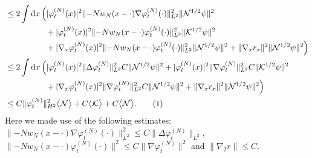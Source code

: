 \documentclass[11pt,a4paper,DIV11]{scrartcl}	%
\newcommand{\di}{\textrm{d}}		%
\newcommand{\Ncal}{\mathcal{N}}		%
\newcommand{\Kcal}{\mathcal{K}}		%
\newcommand{\norm}[1]{\lVert#1\rVert}	%
\newcommand{\ev}[1]{\big<#1\big>}	%
\newcommand{\ph}{\varphi_t^{(N)}}	%
\newcommand{\gradone}{\nabla_2}
\newcommand{\tagg}[1]{ \stepcounter{equation} \tag{\theequation} \label{eq:#1} } %
\begin{document}
\begin{fleqn}[0.5em]
\begin{align*}
& \leq 2\int \di x\, \Big( \lvert \ph(x)\rvert^2 \norm{-N w_N(x-\cdot)\nabla\ph(\cdot)}_{L^2}^2 \norm{\Ncal^{1/2}\psi}^2  \\
& \qquad\qquad\quad + \lvert \ph(x)\rvert^2 \norm{-Nw_N(x-\cdot) \ph(\cdot)}_{L^2}^2 \norm{\Kcal^{1/2}\psi}^2  \\
& \qquad\qquad\quad + \lvert \nabla_x \ph(x)\rvert^2 \norm{-N w_N(x-\cdot) \ph(\cdot)}_{L^2}^2 \norm{\Ncal^{1/2}\psi}^2 + \norm{\nabla_x r_x}^2 \norm{\Ncal^{1/2}\psi}^2 \Big) \\
& \leq 2 \int \di x\, \Big( \lvert \ph(x)\rvert^2 \norm{\Delta \ph}_{L^2}^2 C \norm{\Ncal^{1/2}\psi}^2 + \lvert \ph(x)\rvert^2 \norm{\nabla \ph}_{L^2}^2 C \norm{\Kcal^{1/2}\psi}^2 \\
& \qquad\qquad\quad + \lvert \nabla_x \ph(x)\rvert^2 \norm{\nabla \ph}_{L^2}^2 C \norm{\Ncal^{1/2}\psi}^2 + \norm{\nabla_x r_x}^2 \norm{\Ncal^{1/2}\psi}^2 \Big)\\
& \leq C \norm{\ph}_{H^2}^2 \ev{\Ncal} + C\ev{\Kcal} + C\ev{\Ncal}. \tagg{bound2B}
\end{align*}
Here we made use of the following estimates: $\norm{-N w_N(x-\cdot) \nabla\ph(\cdot)}_{L^2}^2 \leq C\norm{\Delta \ph}_{L^2}$, $\norm{-N w_N(x-\cdot)\ph(\cdot)}^2 \leq C \norm{\nabla \ph}^2$  and $ \norm{\gradone r} \leq C$.\newline


\end{fleqn}
\end{document}
